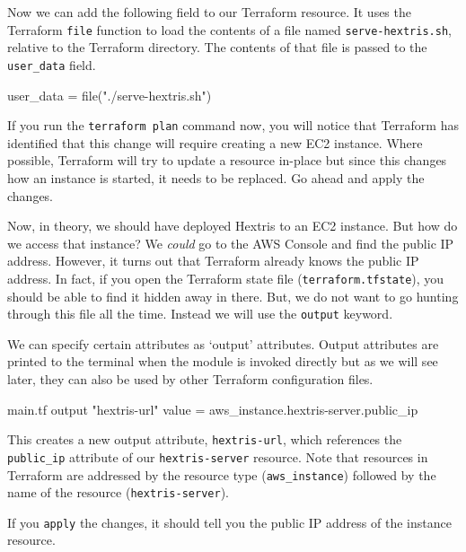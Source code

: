 \documentclass{csse4400}
\begin{document}


Now we can add the following field to our Terraform resource.
It uses the Terraform \texttt{file} function to load the contents of a file named \texttt{serve-hextris.sh},
relative to the Terraform directory.
The contents of that file is passed to the \texttt{user\_data} field.

\begin{code}[language=terraform,numbers=none]{}
user_data = file("./serve-hextris.sh")
\end{code}

If you run the \texttt{terraform plan} command now,
you will notice that Terraform has identified that this change will require creating a new EC2 instance.
Where possible, Terraform will try to update a resource in-place
but since this changes how an instance is started, it needs to be replaced.
Go ahead and apply the changes.

Now, in theory, we should have deployed Hextris to an EC2 instance.
But how do we access that instance?
We \textsl{could} go to the AWS Console and find the public IP address.
However, it turns out that Terraform already knows the public IP address.
In fact, if you open the Terraform state file (\texttt{terraform.tfstate}),
you should be able to find it hidden away in there.
But, we do not want to go hunting through this file all the time.
Instead we will use the \texttt{output} keyword.

We can specify certain attributes as `output' attributes.
Output attributes are printed to the terminal when the module is invoked directly
but as we will see later, they can also be used by other Terraform configuration files.

\begin{code}[language=terraform,numbers=none]{main.tf}
output "hextris-url" {
  value = aws_instance.hextris-server.public_ip
}
\end{code}

This creates a new output attribute, \texttt{hextris-url},
which references the \texttt{public\_ip} attribute of our \texttt{hextris-server} resource.
Note that resources in Terraform are addressed by the resource type (\texttt{aws\_instance})
followed by the name of the resource (\texttt{hextris-server}).

If you \texttt{apply} the changes, it should tell you the public IP address of the instance resource.
\end{document}
